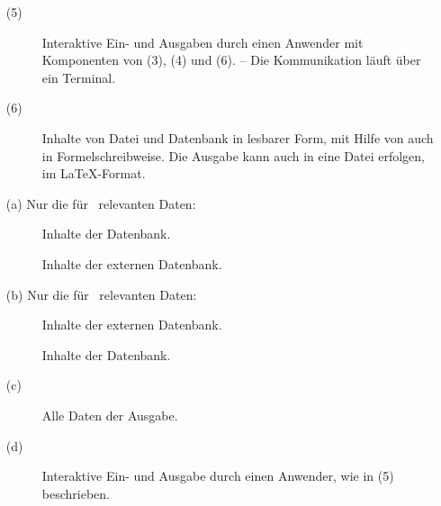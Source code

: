 \begin{itemize}
	\item[(5)]\label{dat:Anwender}
	\begin{description}
		\item[]\label{dat:mitAnwender}
		Interaktive Ein- und Ausgaben durch einen Anwender mit Komponenten von (3), (4) und (6).
		-- Die Kommunikation läuft \textiAlg über ein Terminal.
	\end{description}
	
	\item[(6)]\label{dat:Ausgabe}
	\begin{description}
		\item[]\label{dat:inAusgabe}
		Inhalte von Datei und Datenbank in lesbarer Form, \textua mit Hilfe von  auch in Formelschreibweise.
		Die Ausgabe kann auch in eine Datei erfolgen,
		\textzB im \LaTeX-Format.
	\end{description}
	
	\item[(a)]\label{dat:extInternet}
	Nur die für \ASBA\ relevanten Daten:
	\begin{description}
		\item[]\label{dat:ausextInternet}
		Inhalte der Datenbank.
		\item[]\label{dat:inextInternet}
		Inhalte der externen Datenbank.
	\end{description}
	
	\item[(b)]\label{dat:extDatenbank}
	Nur die für \ASBA\ relevanten Daten:
	\begin{description}
		\item[]
		\label{dat:ausextDatenbank} Inhalte der externen Datenbank.
		\item[]
		\label{dat:inextDatenbank} Inhalte der Datenbank.
	\end{description}
	
	\item[(c)]\label{dat:AusgabeAnwender}
	\begin{description}
		\item[]\label{dat:Ausgabe2Anwender}
		Alle Daten der Ausgabe.
	\end{description}
	
	\item[(d)] \label{dat:AnwenderTerminal}
	\begin{description}
		\item[]\label{dat:Anwender22Terminal}
		Interaktive Ein- und Ausgabe durch einen Anwender, wie in (5) beschrieben.
	\end{description}
	

\end{itemize}
